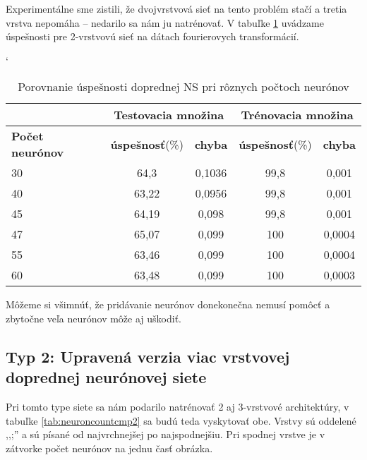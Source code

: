 Experimentálne sme zistili, že dvojvrstvová sieť na tento problém stačí a tretia vrstva nepomáha -- nedarilo sa nám ju natrénovať. V tabuľke \ref{tab:neuroncountcmp} uvádzame úspešnosti pre 2-vrstvovú sieť na dátach fourierovych transformácií.

\begin{table}[h]
\catcode` %
\centering
\begin{tabular}{|l|c|c|c|c|}
\cline{2-5}
\multicolumn{1}{l}{} & \multicolumn{2}{|c|}{\textbf{Testovacia množina}} & \multicolumn{2}{c|}{\textbf{Trénovacia množina}}\\ 
\hline
\textbf{Počet neurónov} & \textbf{úspešnosť}(\%) & \textbf{chyba} & \textbf{úspešnosť}(\%) & \textbf{chyba} \\ \hline
30 & 64,3 & 0,1036 & 99,8 & 0,001 \\ \hline
40 & 63,22 & 0,0956 & 99,8 & 0,001 \\ \hline
45 & 64,19 & 0,098 & 99,8 & 0,001 \\ \hline
47 & 65,07 & 0,099 & 100 & 0,0004 \\ \hline
55 & 63,46 & 0,099 & 100 & 0,0004 \\ \hline
60 & 63,48 & 0,099 & 100 & 0,0003 \\ 
\hline
\end{tabular}
\caption{Porovnanie úspešnosti doprednej NS pri rôznych počtoch neurónov}
\label{tab:neuroncountcmp}
\end{table}

Môžeme si všimnúť, že pridávanie neurónov donekonečna nemusí pomôcť a zbytočne veľa neurónov môže aj uškodiť.

\subsection{Typ 2: Upravená verzia viac vrstvovej doprednej neurónovej siete}

Pri tomto type siete sa nám podarilo natrénovať 2 aj 3-vrstvové architektúry, v tabuľke \ref{tab:neuroncountcmp2} sa budú teda vyskytovať obe. Vrstvy sú oddelené ,,;'' a sú písané od najvrchnejšej po najspodnejšiu. Pri spodnej vrstve je v zátvorke počet neurónov na jednu časť obrázka.

